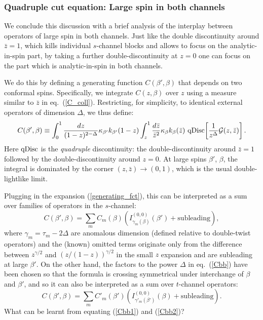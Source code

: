 \documentclass[11pt, reqno,preprint]{article}
\def\be{\begin{equation}}
\def\ee{\end{equation}}
\def\zbar{\bar{z}}
\def\GG{\mathcal{G}}
\begin{document}
\subsubsection{Quadruple cut equation: Large spin in both channels}

We conclude this discussion with a brief analysis of the interplay between operators of large spin in both channels.
Just like the double discontinuity around $\zbar=1$, which kills
individual $s$-channel blocks and allows to focus on the analytic-in-spin part, by taking a further double-discontinuity at $z=0$
one can focus on the part which is analytic-in-spin in both channels.

We do this by defining a generating function $C(\beta',\beta)$ that depends on two conformal spins.
Specifically, we integrate $C(z,\beta)$ over $z$ using a measure similar to $\zbar$ in eq.~(\ref{C_coll}).
Restricting, for simplicity, to identical external operators of dimension $\Delta$, we thus define:
\be
 C(\beta',\beta)%
\equiv \int_0^1 \frac{dz}{(1-z)^{2-\Delta}} \kappa_{\beta'}k_{\beta'}(1-z)
\int_z^1 \frac{d\zbar}{\zbar^2}  \kappa_{\beta}k_\beta(\zbar)\,\,{\rm qDisc}\!\left[\frac{1}{z^\Delta}\GG(z,\zbar)\right].
\label{Cbb}
\ee
Here ${\rm qDisc}$ is the \emph{quadruple} discontinuity: the
double-discontinuity around $\zbar=1$ followed by the double-discontinuity around $z=0$.
At large spins $\beta'$, $\beta$, the integral is dominated by the corner $(z,\zbar)\to (0,1)$,
which is the usual double-lightlike limit.

Plugging in the expansion (\ref{generating_fct}), this can be interpreted as a sum over families
of operators in the $s$-channel:
\be
 C(\beta',\beta) = \sum_{m} C_m(\beta)\left(I^{(0,0)}_{\gamma_m(\beta)}(\beta')+\mbox{subleading}\right), \label{Cbb1}
\ee
where $\gamma_m=\tau_m-2\Delta$ are anomalous dimension (defined relative to double-twist operators)
and the (known) omitted terms originate only from the difference between $z^{\gamma/2}$ and $(z/(1-z))^{\gamma/2}$
in the small $z$ expansion and are subleading at large $\beta'$.
On the other hand, the factors to the power $\Delta$ in eq.~(\ref{Cbb}) have been chosen so that
the formula is crossing symmetrical under interchange of $\beta$ and $\beta'$,
and so it can also be interpreted as a sum over $t$-channel operators:
\be
C(\beta',\beta) = \sum_{m} C'_{m}(\beta')\left(I^{(0,0)}_{\gamma'_{m}(\beta')}(\beta)+\mbox{subleading}\right). \label{Cbb2}
\ee
What can be learnt from equating (\ref{Cbb1}) and (\ref{Cbb2})?
\end{document}
